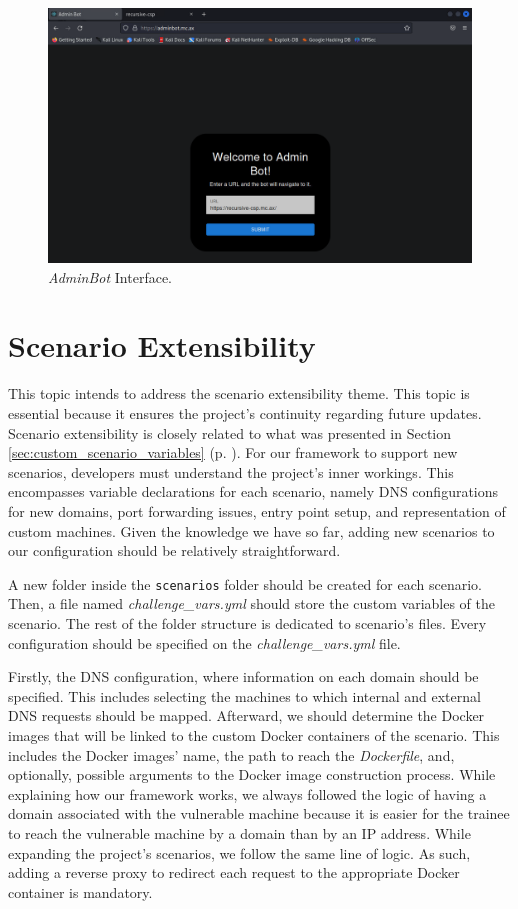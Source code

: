 \begin{figure}[H]
    \includegraphics[width=12cm]{figures/adminbot.png}
    \caption{\textit{AdminBot} Interface.}
    \label{fig:admin_bot}
\end{figure}

\section{Scenario Extensibility} \label{sec:validation_scenario_extensibility}

This topic intends to address the scenario extensibility theme. This topic is essential because it ensures the project's continuity regarding future updates. Scenario extensibility is closely related to what was presented in Section \ref{sec:custom_scenario_variables} (p. \pageref{sec:custom_scenario_variables}). For our framework to support new scenarios, developers must understand the project's inner workings. This encompasses variable declarations for each scenario, namely DNS configurations for new domains, port forwarding issues, entry point setup, and representation of custom machines. Given the knowledge we have so far, adding new scenarios to our configuration should be relatively straightforward. 

A new folder inside the \texttt{scenarios} folder should be created for each scenario. Then, a file named \textit{challenge\_vars.yml} should store the custom variables of the scenario. The rest of the folder structure is dedicated to scenario's files. Every configuration should be specified on the \textit{challenge\_vars.yml} file.

Firstly, the DNS configuration, where information on each domain should be specified. This includes selecting the machines to which internal and external DNS requests should be mapped. Afterward, we should determine the Docker images that will be linked to the custom Docker containers of the scenario. This includes the Docker images' name, the path to reach the \textit{Dockerfile}, and, optionally, possible arguments to the Docker image construction process. While explaining how our framework works, we always followed the logic of having a domain associated with the vulnerable machine because it is easier for the trainee to reach the vulnerable machine by a domain than by an IP address. While expanding the project's scenarios, we follow the same line of logic. As such, adding a reverse proxy to redirect each request to the appropriate Docker container is mandatory. 

